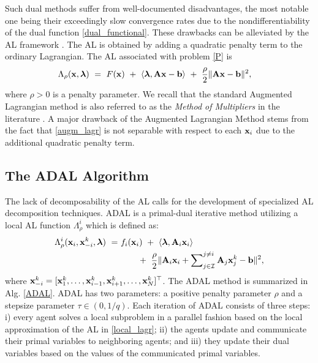 \documentclass[doublecolumn]{IEEEtran}
\begin{document}
Such dual methods suffer from well-documented disadvantages, the most notable one being their exceedingly slow convergence rates due to the nondifferentiability of the dual function \eqref{dual_functional}. These drawbacks can be alleviated by the AL framework \cite[Chapter 2.1]{Bert_Constrained}.
The AL is obtained by adding a quadratic penalty term to the ordinary Lagrangian.
The AL associated with problem \eqref{P} is
\begin{align}\label{augm_lagr}
\Lambda_{\rho}({ {\bf x} },{\boldsymbol{\lambda}}) ~&=~ F({ {\bf x} }) ~+~ \langle {\boldsymbol{\lambda}} , {\bf A} { {\bf x} } - { {\bf b} }\rangle ~+~ \frac{\rho}{2}\| {\bf A}{ {\bf x} } - { {\bf b} } \|^2,
\end{align}
where $\rho>0$ is a penalty parameter. We recall that the standard Augmented Lagrangian method is also referred to as the \emph{Method of Multipliers} in the literature \cite[Chapter 2.1]{Bert_Constrained}. 
A major drawback of the Augmented Lagrangian Method stems from the fact that \eqref{augm_lagr} is not  separable with respect to each ${ {\bf x} }_i$ due to the additional quadratic penalty term.

\subsection{The ADAL Algorithm}

The lack of decomposability of the AL calls for the development of specialized AL decomposition techniques.
ADAL is a primal-dual iterative method utilizing a local AL function $\Lambda_{\rho}^i$ which is defined as:
\begin{align}\label{local_lagr}
\Lambda_{\rho}^i({ {\bf x} }_i,{ {\bf x} }_{-i}^k,{\boldsymbol{\lambda}}) ~=&~ f_i({ {\bf x} }_i) ~+~ \langle {\boldsymbol{\lambda}} ,{\bf A}_i{ {\bf x} }_i \rangle \\
&\qquad ~+~ \frac{\rho}{2}\| {\bf A}_i{ {\bf x} }_i + \sum\nolimits_{j\in\mathcal{I}}^{j\neq i} {\bf A}_j{ {\bf x} }_j^k - { {\bf b} }\|^2, \notag
\end{align}
where ${ {\bf x} }_{-i}^k = [{ {\bf x} }_1^k, \ldots, { {\bf x} }_{i-1}^k,{ {\bf x} }_{i+1}^k,\ldots,{ {\bf x} }_N^k]^{\top}$.
The ADAL method is summarized in Alg. \ref{ADAL}.
ADAL has two parameters: a positive penalty parameter $\rho$ and a stepsize parameter
$\tau \in (0,1/q)$.
Each iteration of ADAL consists of three steps: i) every agent solves a local subproblem in a parallel
fashion based on the local approximation of the AL in \eqref{local_lagr}; 
ii) the agents update and communicate their primal variables to neighboring agents;
and iii) they update their dual variables based on the values of the communicated primal variables.
\end{document}
